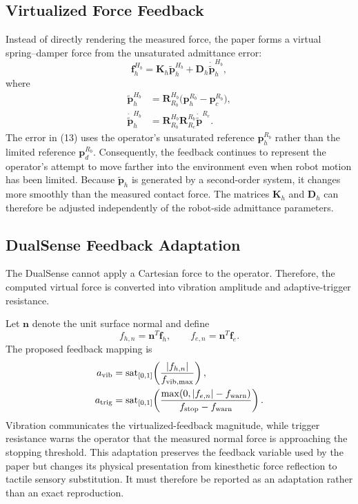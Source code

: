 \documentclass[journal]{IEEEtran}
\newcommand{\p}{\bm{p}}
\newcommand{\f}{\bm{f}}
\newcommand{\R}{\bm{R}}
\newcommand{\K}{\bm{K}}
\newcommand{\D}{\bm{D}}
\newcommand{\pt}{\widetilde{\bm{p}}}
\newcommand{\sat}{\operatorname{sat}}
\begin{document}
\subsection{Virtualized Force Feedback}
Instead of directly rendering the measured force, the paper forms a virtual spring--damper force from the unsaturated admittance error:
\begin{equation}
\f^{H_b}_h=\K_h\pt^{H_b}_h+\D_h\dot{\pt}^{H_b}_h,
\end{equation}
where
\begin{align}
\pt^{H_b}_h &= \R^{H_b}_{R_b}\bigl(\p^{R_b}_h-\p^{R_b}_c\bigr),\\
\dot{\pt}^{H_b}_h &= \R^{H_b}_{R_b}\R^{R_b}_{R_e}\dot{\pt}^{R_e}.
\end{align}
The error in (13) uses the operator's unsaturated reference $\p^{R_b}_h$ rather than the limited reference $\p^{R_b}_d$. Consequently, the feedback continues to represent the operator's attempt to move farther into the environment even when robot motion has been limited. Because $\pt_h$ is generated by a second-order system, it changes more smoothly than the measured contact force. The matrices $\K_h$ and $\D_h$ can therefore be adjusted independently of the robot-side admittance parameters.

\subsection{DualSense Feedback Adaptation}
The DualSense cannot apply a Cartesian force to the operator. Therefore, the computed virtual force is converted into vibration amplitude and adaptive-trigger resistance.

Let $\bm{n}$ denote the unit surface normal and define
\begin{equation}
f_{h,n}=\bm{n}^T\f_h,\qquad f_{e,n}=\bm{n}^T\f_e.
\end{equation}
The proposed feedback mapping is
\begin{align}
a_{\mathrm{vib}}&=\sat_{[0,1]}\!\left(\frac{|f_{h,n}|}{f_{\mathrm{vib,max}}}\right),\notag\\
a_{\mathrm{trig}}&=\sat_{[0,1]}\!\left(\frac{\max(0,|f_{e,n}|-f_{\mathrm{warn}})}{f_{\mathrm{stop}}-f_{\mathrm{warn}}}\right).
\end{align}
Vibration communicates the virtualized-feedback magnitude, while trigger resistance warns the operator that the measured normal force is approaching the stopping threshold. This adaptation preserves the feedback variable used by the paper but changes its physical presentation from kinesthetic force reflection to tactile sensory substitution. It must therefore be reported as an adaptation rather than an exact reproduction.
\end{document}
